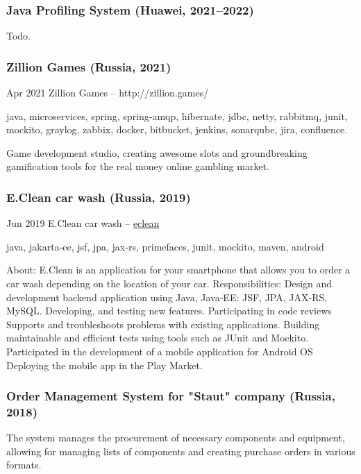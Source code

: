 \documentclass{vl}
\begin{document}
    \subsubsection*{Java Profiling System (Huawei, 2021--2022)}

    Todo.

    \subsubsection*{Zillion Games (Russia, 2021)}

    Apr 2021 Zillion Games – http://zillion.games/

    java, microservices, spring, spring‐amqp, hibernate, jdbc, netty, rabbitmq, junit, mockito, graylog, zabbix, docker,
    bitbucket, jenkins, sonarqube, jira, confluence.

    Game development studio, creating awesome slots and groundbreaking gamification tools for the real money online
    gambling market.

    \subsubsection*{E.Clean car wash (Russia, 2019)}
    Jun 2019 E.Clean car wash – \href{https://play.google.com/store/apps/details?id=com.altinntech.eclean}{eclean}

    java, jakarta‐ee, jsf, jpa, jax‐rs, primefaces, junit, mockito, maven, android

    About: E.Clean is an application for your smartphone that allows you to order a car wash depending on the location
    of your car.
    Responsibilities: Design and development backend application using Java, Java‐EE: JSF, JPA, JAX‐RS, MySQL.
    Developing, and testing new features. Participating in code reviews Supports and troubleshoots problems with
    existing applications. Building maintainable and efficient tests using tools such as JUnit and Mockito.
    Participated in the development of a mobile application for Android OS Deploying the mobile app in the Play Market.

    \subsubsection*{Order Management System for "Staut" company (Russia, 2018)}

    The system manages the procurement of necessary components and equipment,
    allowing for managing lists of components and creating purchase orders in various formats.
\end{document}
